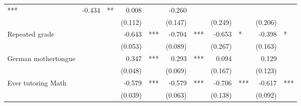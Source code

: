 \documentclass{article}
\begin{document}
\begin{table}[!h]
\begin{tabular}{lllllllllll}
  \multicolumn{1}{l}{***} &
  \multicolumn{1}{r}{-0.434} &
  \multicolumn{1}{l}{**} &
  \multicolumn{1}{r}{0.008} &
  \multicolumn{1}{l}{} &
  \multicolumn{1}{r}{-0.260} &
  \multicolumn{1}{l}{} \\
\multicolumn{1}{l}{} &
  \multicolumn{1}{r}{} &
  \multicolumn{1}{l}{} &
  \multicolumn{1}{r}{(0.112)} &
  \multicolumn{1}{l}{} &
  \multicolumn{1}{r}{(0.147)} &
  \multicolumn{1}{l}{} &
  \multicolumn{1}{r}{(0.249)} &
  \multicolumn{1}{l}{} &
  \multicolumn{1}{r}{(0.206)} &
  \multicolumn{1}{l}{} \\
\multicolumn{1}{l}{Repeated grade} &
  \multicolumn{1}{r}{} &
  \multicolumn{1}{l}{} &
  \multicolumn{1}{r}{-0.643} &
  \multicolumn{1}{l}{***} &
  \multicolumn{1}{r}{-0.704} &
  \multicolumn{1}{l}{***} &
  \multicolumn{1}{r}{-0.653} &
  \multicolumn{1}{l}{*} &
  \multicolumn{1}{r}{-0.398} &
  \multicolumn{1}{l}{*} \\
\multicolumn{1}{l}{} &
  \multicolumn{1}{r}{} &
  \multicolumn{1}{l}{} &
  \multicolumn{1}{r}{(0.053)} &
  \multicolumn{1}{l}{} &
  \multicolumn{1}{r}{(0.089)} &
  \multicolumn{1}{l}{} &
  \multicolumn{1}{r}{(0.267)} &
  \multicolumn{1}{l}{} &
  \multicolumn{1}{r}{(0.163)} &
  \multicolumn{1}{l}{} \\
\multicolumn{1}{l}{German mothertongue} &
  \multicolumn{1}{r}{} &
  \multicolumn{1}{l}{} &
  \multicolumn{1}{r}{0.347} &
  \multicolumn{1}{l}{***} &
  \multicolumn{1}{r}{0.293} &
  \multicolumn{1}{l}{***} &
  \multicolumn{1}{r}{0.094} &
  \multicolumn{1}{l}{} &
  \multicolumn{1}{r}{0.129} &
  \multicolumn{1}{l}{} \\
\multicolumn{1}{l}{} &
  \multicolumn{1}{r}{} &
  \multicolumn{1}{l}{} &
  \multicolumn{1}{r}{(0.048)} &
  \multicolumn{1}{l}{} &
  \multicolumn{1}{r}{(0.069)} &
  \multicolumn{1}{l}{} &
  \multicolumn{1}{r}{(0.167)} &
  \multicolumn{1}{l}{} &
  \multicolumn{1}{r}{(0.123)} &
  \multicolumn{1}{l}{} \\
\multicolumn{1}{l}{Ever tutoring Math} &
  \multicolumn{1}{r}{} &
  \multicolumn{1}{l}{} &
  \multicolumn{1}{r}{-0.579} &
  \multicolumn{1}{l}{***} &
  \multicolumn{1}{r}{-0.579} &
  \multicolumn{1}{l}{***} &
  \multicolumn{1}{r}{-0.706} &
  \multicolumn{1}{l}{***} &
  \multicolumn{1}{r}{-0.617} &
  \multicolumn{1}{l}{***} \\
\multicolumn{1}{l}{} &
  \multicolumn{1}{r}{} &
  \multicolumn{1}{l}{} &
  \multicolumn{1}{r}{(0.039)} &
  \multicolumn{1}{l}{} &
  \multicolumn{1}{r}{(0.063)} &
  \multicolumn{1}{l}{} &
  \multicolumn{1}{r}{(0.138)} &
  \multicolumn{1}{l}{} &
  \multicolumn{1}{r}{(0.092)} &

\end{tabular}
\end{table}
\end{document}
